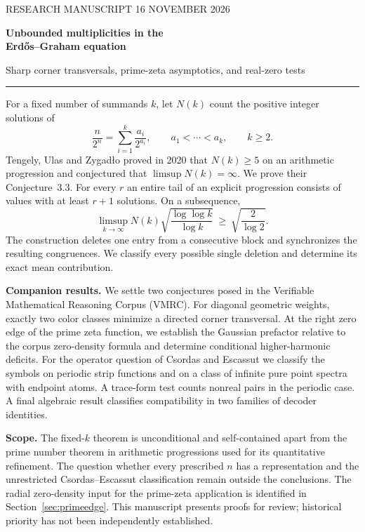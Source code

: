 \documentclass[11pt]{article}
\begin{document}
\thispagestyle{plain}
{\sffamily\small\color{accent} RESEARCH MANUSCRIPT \hfill 16 NOVEMBER 2026}\par
\vspace{10pt}
{\color{ink}\sffamily\bfseries\fontsize{24}{28}\selectfont Unbounded multiplicities in the\\ Erd\H{o}s--Graham equation\par}
\vspace{5pt}
{\large\sffamily Sharp corner transversals, prime-zeta asymptotics, and real-zero tests}\par
\vspace{9pt}{\normalsize Keio and Shaitetsu}\par
\vspace{7pt}\noindent\textcolor{accent}{\rule{\linewidth}{0.6pt}}
\medskip

For a fixed number of summands $k$, let $N(k)$ count the positive integer
solutions of
\[
 \frac{n}{2^n}=\sum_{i=1}^k\frac{a_i}{2^{a_i}},\qquad
 a_1<\cdots<a_k,\qquad k\ge2 .
\]
Tengely, Ulas and Zygad\l o proved in 2020 that $N(k)\ge5$ on an
arithmetic progression and conjectured that $\limsup N(k)=\infty$.
We prove their Conjecture~3.3. For every $r$ an entire tail of an
explicit progression consists of values with at least $r+1$ solutions.
On a subsequence,
\[
 \limsup_{k\to\infty}N(k)\sqrt{\frac{\log\log k}{\log k}}
 \ \ge\ \sqrt{\frac{2}{\log 2}} .
\]
The construction deletes one entry from a consecutive block and
synchronizes the resulting congruences. We classify every possible
single deletion and determine its exact mean contribution.

\medskip
\noindent\textbf{Companion results.} We settle two conjectures posed in the
Verifiable Mathematical Reasoning Corpus (VMRC). For diagonal geometric
weights, exactly two color classes minimize a directed corner
transversal. At the right zero edge of the prime zeta function, we
establish the Gaussian prefactor relative to the corpus zero-density
formula and determine conditional higher-harmonic deficits.
For the operator question of Csordas and Escassut we classify the
symbols on periodic strip functions and on a class of infinite pure
point spectra with endpoint atoms. A trace-form test counts nonreal
pairs in the periodic case. A final algebraic result classifies
compatibility in two families of decoder identities.

\medskip
\noindent\textbf{Scope.} The fixed-$k$ theorem is unconditional and
self-contained apart from the prime number theorem in arithmetic
progressions used for its quantitative refinement. The question whether
every prescribed $n$ has a representation and the unrestricted
Csordas--Escassut classification remain outside the conclusions.
The radial zero-density input for the prime-zeta application is
identified in Section~\ref{sec:primeedge}. This manuscript presents
proofs for review; historical priority has not been independently established.
\newpage
\end{document}

